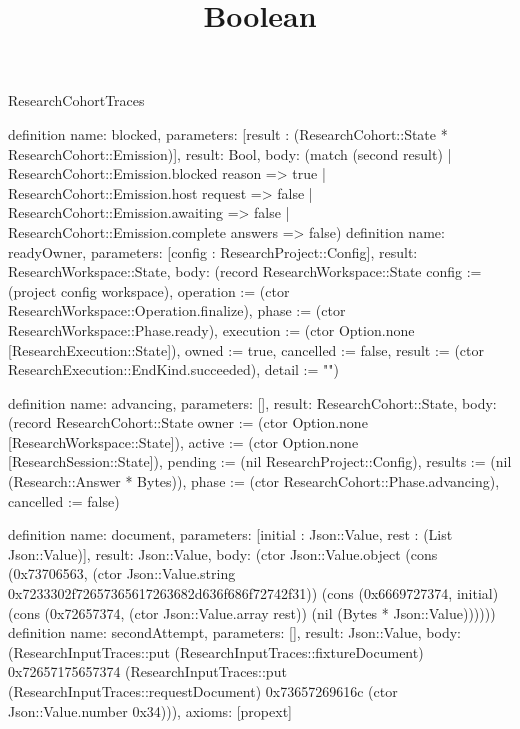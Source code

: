 \begin{lexlean}{ResearchCohortTraces}
\title{Boolean}
\begin{semanticmodule}
definition{
 name: blocked,
 parameters: [result : (ResearchCohort::State * ResearchCohort::Emission)],
 result: Bool,
 body: (match (second result) | ResearchCohort::Emission.blocked reason => true | ResearchCohort::Emission.host request => false | ResearchCohort::Emission.awaiting => false | ResearchCohort::Emission.complete answers => false)
}
definition{
 name: readyOwner,
 parameters: [config : ResearchProject::Config],
 result: ResearchWorkspace::State,
 body: (record ResearchWorkspace::State {config := (project config workspace), operation := (ctor ResearchWorkspace::Operation.finalize), phase := (ctor ResearchWorkspace::Phase.ready), execution := (ctor Option.none [ResearchExecution::State]), owned := true, cancelled := false, result := (ctor ResearchExecution::EndKind.succeeded), detail := ""})
}

definition{
 name: advancing,
 parameters: [],
 result: ResearchCohort::State,
 body: (record ResearchCohort::State {owner := (ctor Option.none [ResearchWorkspace::State]), active := (ctor Option.none [ResearchSession::State]), pending := (nil ResearchProject::Config), results := (nil (Research::Answer * Bytes)), phase := (ctor ResearchCohort::Phase.advancing), cancelled := false})
}

definition{
 name: document,
 parameters: [initial : Json::Value, rest : (List Json::Value)],
 result: Json::Value,
 body: (ctor Json::Value.object (cons (0x73706563, (ctor Json::Value.string 0x7233302f72657365617263682d636f686f72742f31)) (cons (0x6669727374, initial) (cons (0x72657374, (ctor Json::Value.array rest)) (nil (Bytes * Json::Value))))))
}
definition{
 name: secondAttempt,
 parameters: [],
 result: Json::Value,
 body: (ResearchInputTraces::put (ResearchInputTraces::fixtureDocument) 0x72657175657374 (ResearchInputTraces::put (ResearchInputTraces::requestDocument) 0x73657269616c (ctor Json::Value.number 0x34))),
 axioms: [propext]
}

\end{semanticmodule}
\end{lexlean}
